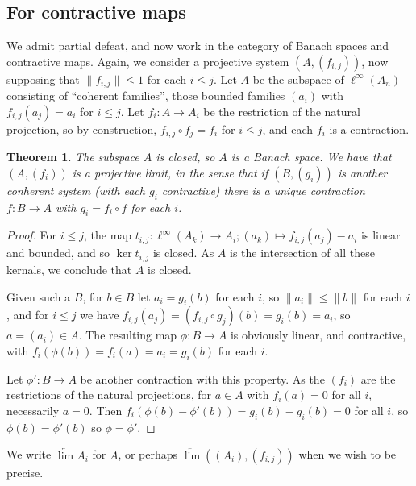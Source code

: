 \documentclass[a4paper,11pt]{article}
\newtheorem{theorem}[lemma]{Theorem}
\theoremstyle{definition}
\begin{document}
\subsection{For contractive maps}\label{sec:cont_case}

We admit partial defeat, and now work in the category of Banach spaces and contractive maps.  Again, we consider a projective system $(A,(f_{i,j}))$, now supposing that $\|f_{i,j}\|\leq 1$ for each $i\leq j$.  Let $A$ be the subspace of $\ell^\infty(A_n)$ consisting of ``coherent families'', those bounded families $(a_i)$ with $f_{i,j}(a_j) = a_i$ for $i\leq j$.  Let $f_i \colon A\to A_i$ be the restriction of the natural projection, so by construction, $f_{i,j} \circ f_j = f_i$ for $i \leq j$, and each $f_i$ is a contraction.

\begin{theorem}\label{thm:proj_contractive_case}
The subspace $A$ is closed, so $A$ is a Banach space.  We have that $(A,(f_i))$ is a projective limit, in the sense that if $(B,(g_i))$ is another conherent system (with each $g_i$ contractive) there is a unique contraction $f \colon B \to A$ with $g_i = f_i\circ f$ for each $i$.
\end{theorem}
\begin{proof}
For $i\leq j$, the map $t_{i,j} \colon \ell^\infty(A_k) \to A_i; (a_k)\mapsto f_{i,j}(a_j) - a_i$ is linear and bounded, and so $\ker t_{i,j}$ is closed.  As $A$ is the intersection of all these kernals, we conclude that $A$ is closed.

Given such a $B$, for $b\in B$ let $a_i = g_i(b)$ for each $i$, so $\|a_i\| \leq \|b\|$ for each $i$, and for $i\leq j$ we have $f_{i,j}(a_j) = (f_{i,j}\circ g_j)(b) = g_i(b) = a_i$, so $a=(a_i)\in A$.  The resulting map $\phi \colon B \to A$ is obviously linear, and contractive, with $f_i(\phi(b)) = f_i(a) = a_i = g_i(b)$ for each $i$.

Let $\phi'\colon B \to A$ be another contraction with this property.  As the $(f_i)$ are the restrictions of the natural projections, for $a\in A$ with $f_i(a)=0$ for all $i$, necessarily $a=0$.  Then $f_i(\phi(b)-\phi'(b)) = g_i(b) - g_i(b) = 0$ for all $i$, so $\phi(b) = \phi'(b)$ so $\phi = \phi'$.
\end{proof}

We write $\underleftarrow{\lim} A_i$ for $A$, or perhaps $\underleftarrow{\lim} ((A_i), (f_{i,j}))$ when we wish to be precise.
\end{document}

